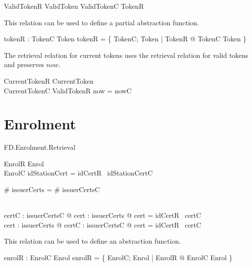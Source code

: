 \begin{zed}
        ValidTokenR  ValidToken \land ValidTokenC \land TokenR
\end{zed}

This relation can be used to define a partial abstraction function. 

\begin{axdef}
        tokenR : TokenC \pfun  Token
\where
        tokenR = \{ TokenC; Token | TokenR @ 
        \theta TokenC \mapsto \theta Token \} 
\end{axdef}


The retrieval relation for current tokens uses the retrieval relation
for valid tokens and preserves $now$.
\begin{schema}{CurrentTokenR}
        CurrentToken
\\      CurrentTokenC
\where
        ValidTokenR
\also
        now = nowC
\end{schema}

\section{Enrolment}

\begin{traceunit}{FD.Enrolment.Retrieval}
\end{traceunit}

\begin{schema}{EnrolR}
        Enrol
\\      EnrolC
\where
        idStationCert = idCertR~ idStationCertC

\also
        \# issuerCerts = \# issuerCertsC

\\      \forall certC : \ran issuerCertsC @ \exists cert : issuerCerts @
        cert = idCertR~ certC
\\      \forall cert : issuerCerts @ \exists certC : \ran issuerCertsC @
        cert = idCertR~ certC

\end{schema}

This relation can be used to define an abstraction function. 

\begin{axdef}
        enrolR : EnrolC \fun  Enrol
\where
        enrolR = \{ EnrolC; Enrol | EnrolR @ 
        \theta EnrolC \mapsto \theta Enrol \} 
\end{axdef}


